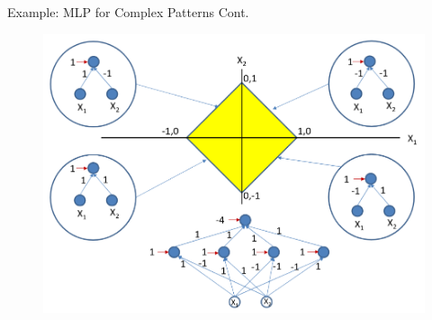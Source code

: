 \documentclass[serif, aspectratio=169]{beamer}
\begin{document}
\begin{frame}{Example: MLP for Complex Patterns Cont.}
	\begin{figure}[htpb]
		\begin{center}
			\includegraphics[keepaspectratio, scale=0.25]{pic/2/ex6.png}
		\end{center}
	\end{figure}
\end{frame}
\end{document}
